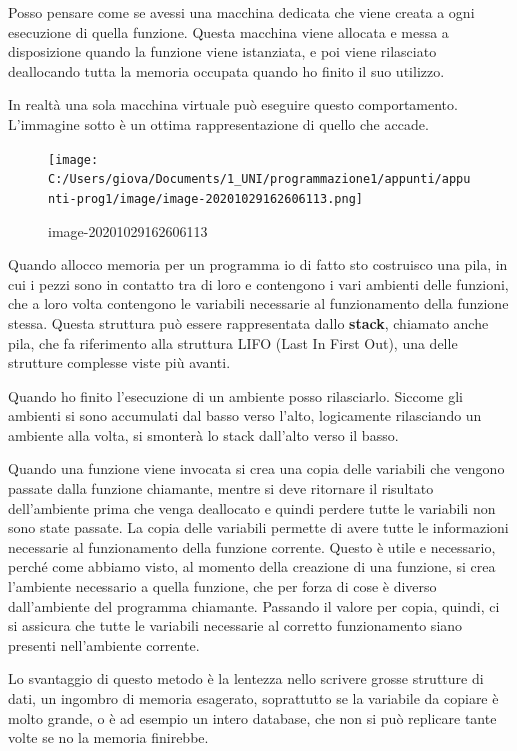 \documentclass[
  paper=a4,
  oneside  ,captions=tableheading
]{scrbook}
\begin{document}
Posso pensare come se avessi una macchina dedicata che viene creata a
ogni esecuzione di quella funzione. Questa macchina viene allocata e
messa a disposizione quando la funzione viene istanziata, e poi viene
rilasciato deallocando tutta la memoria occupata quando ho finito il suo
utilizzo.

In realtà una sola macchina virtuale può eseguire questo comportamento.
L'immagine sotto è un ottima rappresentazione di quello che accade.

\begin{figure}
\centering
\texttt{[image: C:/Users/giova/Documents/1\_UNI/programmazione1/appunti/appunti-prog1/image/image-20201029162606113.png]}
\caption{image-20201029162606113}
\end{figure}

Quando allocco memoria per un programma io di fatto sto costruisco una
pila, in cui i pezzi sono in contatto tra di loro e contengono i vari
ambienti delle funzioni, che a loro volta contengono le variabili
necessarie al funzionamento della funzione stessa. Questa struttura può
essere rappresentata dallo \textbf{stack}, chiamato anche pila, che fa
riferimento alla struttura LIFO (Last In First Out), una delle strutture
complesse viste più avanti.

Quando ho finito l'esecuzione di un ambiente posso rilasciarlo. Siccome
gli ambienti si sono accumulati dal basso verso l'alto, logicamente
rilasciando un ambiente alla volta, si smonterà lo stack dall'alto verso
il basso.

Quando una funzione viene invocata si crea una copia delle variabili che
vengono passate dalla funzione chiamante, mentre si deve ritornare il
risultato dell'ambiente prima che venga deallocato e quindi perdere
tutte le variabili non sono state passate. La copia delle variabili
permette di avere tutte le informazioni necessarie al funzionamento
della funzione corrente. Questo è utile e necessario, perché come
abbiamo visto, al momento della creazione di una funzione, si crea
l'ambiente necessario a quella funzione, che per forza di cose è diverso
dall'ambiente del programma chiamante. Passando il valore per copia,
quindi, ci si assicura che tutte le variabili necessarie al corretto
funzionamento siano presenti nell'ambiente corrente.

Lo svantaggio di questo metodo è la lentezza nello scrivere grosse
strutture di dati, un ingombro di memoria esagerato, soprattutto se la
variabile da copiare è molto grande, o è ad esempio un intero database,
che non si può replicare tante volte se no la memoria finirebbe.
\end{document}
